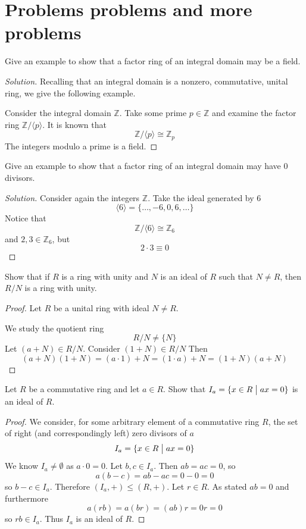 \section{Problems problems and more problems}
\begin{prob}
    Give an example to show that a factor ring of an integral domain 
    may be a field.
\end{prob}
\begin{proof}[Solution]
    Recalling that an integral domain is a nonzero, commutative, 
    unital ring, we give the following example.

    Consider the integral domain $\mathbb Z$.
    Take some prime $p \in \mathbb Z$ and examine the factor ring 
    $\mathbb Z/\langle p\rangle$. It is known that 
    \[
        \mathbb Z/\langle p\rangle \cong \mathbb Z_p
    \]
    The integers modulo a prime is a field.
\end{proof}
\begin{prob}
    Give an example to show that a factor ring of an integral domain 
    may have $0$ divisors.
\end{prob}
\begin{proof}[Solution]
    Consider again the integers $\mathbb Z$. Take the ideal 
    generated by $6$ 
    \[
        \langle 6 \rangle = \{\ldots,-6,0,6,\ldots\}
    \]
    Notice that 
    \[
        \mathbb Z/\langle 6 \rangle \cong \mathbb Z_6
    \]
    and $2,3 \in \mathbb Z_6$, but 
    \[
        2\cdot 3 \equiv 0
    \]
\end{proof}
\begin{prob}
    Show that if $R$ is a ring with unity and $N$ is an ideal 
    of $R$ such that $N \neq R$, then $R/N$ is a ring with unity.
\end{prob}
\begin{proof}
    Let $R$ be a unital ring with ideal $N \neq R$.

    We study the quotient ring 
    \[
        R / N \neq \{N\}
    \]
    Let $(a + N) \in R / N$. Consider $(1+N) \in R/N$ 
    Then 
    \[
        (a+N)(1 + N) = (a\cdot1) + N = (1 \cdot a) + N 
        = (1 + N)(a + N)
    \]
\end{proof}
\begin{prob}
    Let $R$ be a commutative ring and let $a \in R$. 
    Show that $I_a = \{x \in R \bigm| ax = 0\}$ is an ideal of 
    $R$.
\end{prob}
\begin{proof}
    We consider, for some arbitrary element of a commutative ring $R$,
    the set of right (and correspondingly left) zero divisors of 
    $a$ 
    \[
        I_a = \{x \in R \bigm| ax = 0\}
    \]
    We know $I_a \neq \emptyset$ as $a\cdot 0 = 0$. 
    Let $b,c \in I_a$. Then $ab = ac = 0$, so
    \[
        a(b-c) = ab - ac = 0 - 0 = 0
    \]
    so $b-c \in I_a$. Therefore $(I_a,+) \leq (R,+)$. Let 
    $r \in R$. As stated $ab = 0$ and furthermore 
    \[
        a(rb) = a(br) = (ab)r = 0r = 0
    \]
    so $rb \in I_a$. Thus $I_a$ is an ideal of $R$.
\end{proof}
